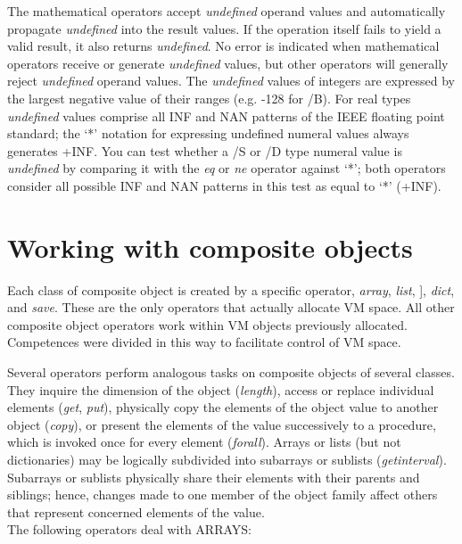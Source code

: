 The   mathematical   operators  accept  \emph{undefined} operand values and automatically propagate \emph{undefined} into the result values. If the operation itself fails to yield a valid result,  it also returns \emph{undefined}. No error is indicated when mathematical operators receive or generate \emph{undefined} values, but other operators will generally reject \emph{undefined} operand values. The \emph{undefined} values of integers are expressed by the largest negative value of their ranges (e.g. -128 for /B). For real types \emph{undefined} values comprise all INF and NAN patterns of the IEEE floating point standard; the `*' notation for expressing undefined numeral values always generates +INF. You can test whether a /S or /D type numeral value is \emph{undefined} by comparing it with the \emph{eq} or \emph{ne} operator against `*'; both operators consider all possible INF and NAN patterns in this test as equal to `*' (+INF).


\section{Working with composite objects}

Each class of composite object is created by a specific  operator, \emph{array},  \emph{list}, ], \emph{dict}, and \emph{save}. These are the only operators that actually allocate VM space.  All other composite object operators work within VM objects previously allocated. Competences  were  divided  in this way to facilitate  control  of VM space. 

Several  operators  perform  analogous  tasks  on  composite  objects  of several classes. They inquire the dimension of the object (\emph{length}), access or replace individual elements (\emph{get}, \emph{put}), physically copy the elements of the object value to another object (\emph{copy}),  or present the elements of  the value successively to a procedure, which is invoked once for every element (\emph{forall}).  Arrays  or  lists  (but  not  dictionaries)  may  be  logically subdivided into subarrays or sublists (\emph{getinterval}). Subarrays or sublists physically  share their elements with their parents and  siblings;  hence, changes  made  to  one  member of the object  family  affect  others  that represent  concerned elements of the value.\\

\noindent The following operators deal with ARRAYS:
\nopagebreak \\

